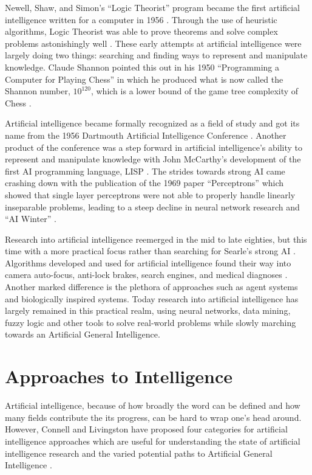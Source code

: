 \documentclass[oneside,12pt,openany]{book}
\begin{document}
	Newell, Shaw, and Simon's ``Logic Theorist'' program became the first artificial intelligence written for a computer in 1956 \cite{Gugerty}. Through the use of heuristic algorithms, Logic Theorist was able to prove theorems and solve complex problems astonishingly well \cite{Gugerty}. These early attempts at artificial intelligence were largely doing two things: searching and finding ways to represent and manipulate knowledge. Claude Shannon pointed this out in his 1950 ``Programming a Computer for Playing Chess'' in which he produced what is now called the Shannon number, $10^{120}$, which is a lower bound of the game tree complexity of Chess \cite{Jones}.
	
	Artificial intelligence became formally recognized as a field of study and got its name from the 1956 Dartmouth Artificial Intelligence Conference \cite{Buchanan}. Another product of the conference was a step forward in artificial intelligence's ability to represent and manipulate knowledge with John McCarthy's development of the first AI programming language, LISP \cite{Jones}. The strides towards strong AI came crashing down with the publication of the 1969 paper ``Perceptrons'' which showed that single layer perceptrons were not able to properly handle linearly inseparable problems, leading to a steep decline in neural network research and ``AI Winter'' \cite{Jones}.
	
	Research into artificial intelligence reemerged in the mid to late eighties, but this time with a more practical focus rather than searching for Searle's strong AI \cite{Jones}. Algorithms developed and used for artificial intelligence found their way into camera auto-focus, anti-lock brakes, search engines, and medical diagnoses \cite{Jones}. Another marked difference is the plethora of approaches such as agent systems and biologically inspired systems. Today research into artificial intelligence has largely remained in this practical realm, using neural networks, data mining, fuzzy logic and other tools to solve real-world problems while slowly marching towards an Artificial General Intelligence.
	
	\section{Approaches to Intelligence}
	
	Artificial intelligence, because of how broadly the word can be defined and how many fields contribute the its progress, can be hard to wrap one's head around. However, Connell and Livingston have proposed four categories for artificial intelligence approaches which are useful for understanding the state of artificial intelligence research and the varied potential paths to Artificial General Intelligence \cite{Connell}.
	
\end{document}
